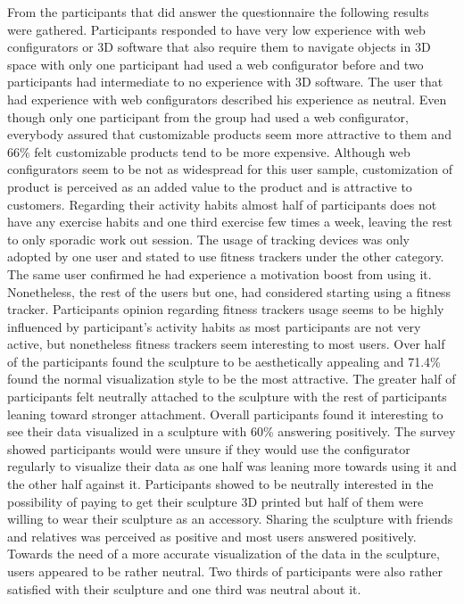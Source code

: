 \documentclass[../medieninformatik-arbeit.tex]{subfiles}
\begin{document}
From the participants that did answer the questionnaire the following results were gathered. Participants responded to have very low experience with web configurators or 3D software that also require them to navigate objects in 3D space with only one participant had used a web configurator before and two participants had intermediate to no experience with 3D software. The user that had experience with web configurators described his experience as neutral. Even though only one participant from the group had used a web configurator, everybody assured that customizable products seem more attractive to them and 66\% felt customizable products tend to be more expensive. Although web configurators seem to be not as widespread for this user sample, customization of product is perceived as an added value to the product and is attractive to customers. 
Regarding their activity habits almost half of participants does not have any exercise habits and one third exercise few times a week, leaving the rest to only sporadic work out session. The usage of tracking devices was only adopted by one user and stated to use fitness trackers under the other category. The same user confirmed he had experience a motivation boost from using it. Nonetheless, the rest of the users but one, had considered starting using a fitness tracker. Participants opinion regarding fitness trackers usage seems to be highly influenced by participant's activity habits as most participants are not very active, but nonetheless fitness trackers seem interesting to most users. 
Over half of the participants found the sculpture to be aesthetically appealing and 71.4\% found the normal visualization style to be the most attractive. The greater half of participants felt neutrally attached to the sculpture with the rest of participants leaning toward stronger attachment. Overall participants found it interesting to see their data visualized in a sculpture with 60\% answering positively. The survey showed participants would were unsure if they would use the configurator regularly to visualize their data as one half was leaning more towards using it and the other half against it. Participants showed to be neutrally interested in the possibility of paying to get their sculpture 3D printed but half of them were willing to wear their sculpture as an accessory. Sharing the sculpture with friends and relatives was perceived as positive and most users answered positively. Towards the need of a more accurate visualization of the data in the sculpture, users appeared to be rather neutral. Two thirds of participants were also rather satisfied with their sculpture and one third was neutral about it. 
\end{document}
